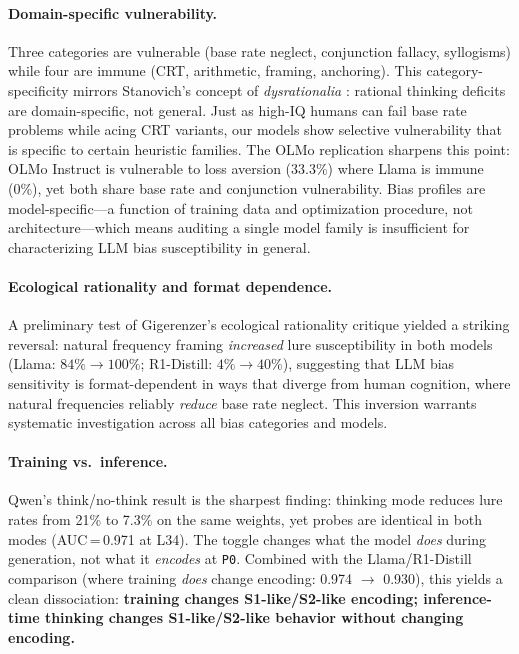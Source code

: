 \documentclass[accepted]{article}
\newcommand{\sone}{S1-like}
\newcommand{\stwo}{S2-like}
\newcommand{\pzero}{\texttt{P0}}
\begin{document}
\paragraph{Domain-specific vulnerability.}
Three categories are vulnerable (base rate neglect, conjunction fallacy,
syllogisms) while four are immune (CRT, arithmetic, framing, anchoring).
This category-specificity mirrors Stanovich's concept of \emph{dysrationalia}
\citep{stanovich2016rationality}: rational thinking deficits are
domain-specific, not general.  Just as high-IQ humans can fail base rate
problems while acing CRT variants, our models show selective vulnerability
that is specific to certain heuristic families.  The OLMo replication
sharpens this point: OLMo Instruct is vulnerable to loss aversion
(33.3\%) where Llama is immune (0\%), yet both share base rate and
conjunction vulnerability.  Bias profiles are model-specific---a function
of training data and optimization procedure, not architecture---which
means auditing a single model family is insufficient for characterizing
LLM bias susceptibility in general.

\paragraph{Ecological rationality and format dependence.}
A preliminary test of Gigerenzer's ecological rationality critique
\citep{gigerenzer1995improve} yielded a striking reversal: natural
frequency framing \emph{increased} lure susceptibility in both models
(Llama: $84\% \to 100\%$; R1-Distill: $4\% \to 40\%$), suggesting
that LLM bias sensitivity is format-dependent in ways that diverge from
human cognition, where natural frequencies reliably \emph{reduce}
base rate neglect.  This inversion warrants systematic investigation
across all bias categories and models.

\paragraph{Training vs.\ inference.}
Qwen's think/no-think result is the sharpest finding: thinking mode
reduces lure rates from 21\% to 7.3\% on the same weights, yet probes
are identical in both modes (AUC\,=\,0.971 at L34).  The toggle
changes what the model \emph{does} during generation, not what it
\emph{encodes} at \pzero{}.  Combined with the Llama/R1-Distill comparison
(where training \emph{does} change encoding: 0.974 $\to$ 0.930), this
yields a clean dissociation: \textbf{training changes \sone{}/\stwo{}
encoding; inference-time thinking changes \sone{}/\stwo{} behavior
without changing encoding.}
\end{document}
